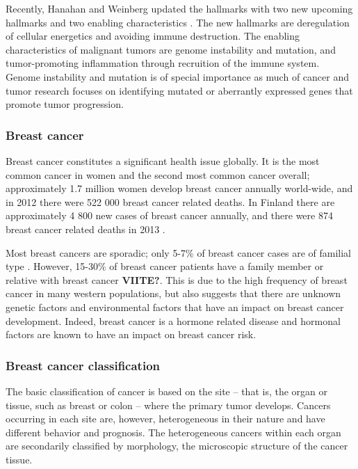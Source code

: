 Recently, Hanahan and Weinberg updated the hallmarks with two new upcoming
hallmarks and two enabling characteristics \citep{Hanahan2011}. The new
hallmarks are deregulation of cellular energetics and avoiding immune
destruction. The enabling characteristics of malignant tumors are genome
instability and mutation, and tumor-promoting inflammation through recruition
of the immune system. Genome instability and mutation is of special importance
as much of cancer and tumor research focuses  on identifying mutated or
aberrantly expressed genes that promote tumor progression.



\subsubsection{Breast cancer}\label{breast-cancer}

Breast cancer constitutes a significant health issue globally. It is the most
common cancer in women and the second most common cancer overall;
approximately 1.7 million women develop breast cancer annually world-wide, and
in 2012 there were 522 000 breast cancer related deaths.
\citep{Ferlay2015} In Finland there are approximately 4 800 new cases of
breast cancer annually, and there were 874 breast cancer related deaths in
2013 \citep{Syoparekisteri}.

Most breast cancers are sporadic; only 5-7\% of breast cancer cases are of
familial type \citep{Melchor2013}. However, 15-30\% of breast cancer patients
have a family member or relative with breast cancer \textbf{VIITE?}. This is due to the high
frequency of breast cancer in many western populations, but also suggests that
there are unknown genetic factors and environmental factors that have an
impact on breast cancer development.  Indeed, breast cancer is a hormone
related disease and hormonal factors are known to have an impact on
breast cancer risk.


\subsubsection{Breast cancer classification}\label{breast-cancer-classification}

The basic classification of cancer is based on the site -- that is, the organ or
tissue, such as breast or colon -- where the primary tumor develops. Cancers
occurring in each site are, however, heterogeneous in their nature and have
different behavior and prognosis. The heterogeneous cancers
within each organ are secondarily classified by morphology, the microscopic structure of
the cancer tissue.

